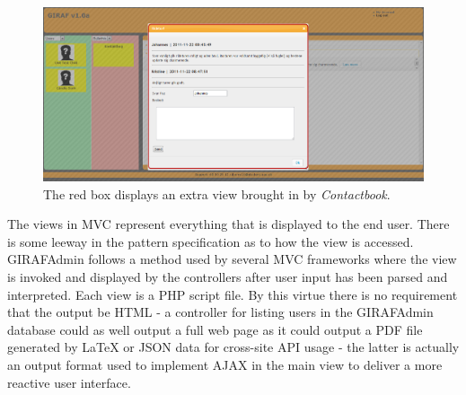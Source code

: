 \begin{figure}
    \begin{center}
    \includegraphics[scale=0.45,angle=90]{img/mvc_details/mvc_detailed_views2_view}
    \caption{\label{implementation_view_views1}The red box displays an extra view brought in by \emph{Contactbook}.}
    \end{center}
\end{figure}

The views in MVC represent everything that is displayed to the end user. There is some leeway in the pattern specification as to how the view is accessed. GIRAFAdmin follows a method used by several MVC frameworks where the view is invoked and displayed by the controllers after user input has been parsed and interpreted. Each view is a PHP script file. By this virtue there is no requirement that the output be HTML - a controller for listing users in the GIRAFAdmin database could as well output a full web page as it could output a PDF file generated by LaTeX or JSON data for cross-site API usage - the latter is actually an output format used to implement AJAX in the main view to deliver a more reactive user interface.


